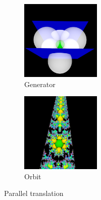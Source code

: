 \begin{figure}[h!tbp]
 \begin{minipage}{0.49\hsize}
  \begin{subfigure}{0.24\textwidth}
   \begin{center}
    \includegraphics[width=1.5in, height=1.5in, keepaspectratio]{../img/klein/3diis/translationGen.pdf}
    \caption{Generator}
    \label{fig:translationGen}
   \end{center}
  \end{subfigure}
 \hspace*{\fill}
 \begin{subfigure}{0.24\textwidth}
  \begin{center}
   \includegraphics[width=1.5in, height=1.5in, keepaspectratio]{../img/klein/3diis/translationOrbit.pdf}
   \caption{Orbit}
    \label{fig:translationOrb}
  \end{center}
 \end{subfigure}
 \hspace*{\fill}
\caption{Parallel translation}
 \label{fig:translation3d}


\end{minipage}
\end{figure}
